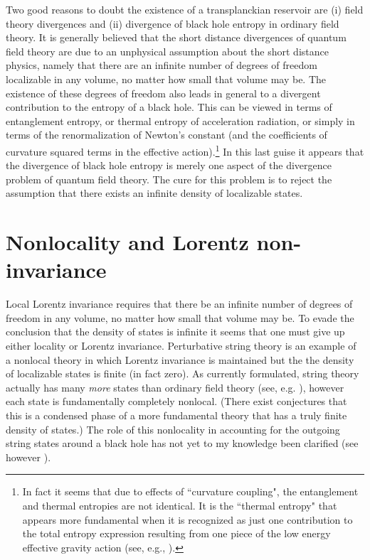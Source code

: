 \documentclass[12pt]{article}
\begin{document}
Two good reasons to doubt the existence of a transplanckian reservoir
are (i) field theory divergences and (ii) divergence of black hole
entropy in ordinary field theory.  It is generally believed that the
short distance divergences of quantum field theory are due to an
unphysical assumption about the short distance physics, namely that
there are  an infinite number of degrees of freedom localizable in any
volume, no matter how small that volume may be.  The existence of these
degrees of freedom also leads in general to a divergent contribution to
the entropy of a black hole. This can be viewed in terms of
entanglement entropy\cite{Sork,Bombetal,FrolNovi}, or thermal entropy
of acceleration radiation\cite{tHooft}, or simply in terms of the
renormalization of Newton's constant (and the coefficients of curvature
squared terms in the effective
action)\cite{SussUglu,Jacoindu}.\footnote{In fact it seems that due to
effects of ``curvature coupling", the entanglement and thermal
entropies are not identical. It is the ``thermal entropy" that appears
more fundamental when it is recognized as just one contribution to the
total entropy expression resulting from one piece of the low energy
effective gravity action (see, e.g., \cite{Frol-rev}).} In this last
guise it appears that the divergence of black hole entropy is merely
one aspect of the divergence problem of quantum field theory.  The cure
for this problem is to reject the assumption that there exists an
infinite density of localizable states.


\section{Nonlocality and Lorentz non-invariance}

Local Lorentz invariance requires that there be an infinite number of
degrees of freedom in any volume, no matter how small that volume may
be. To evade the conclusion that the density of states is infinite it
seems that one must give up either locality or Lorentz invariance.
Perturbative string theory is an example of a nonlocal theory in which
Lorentz invariance is maintained but the the density of localizable
states is finite (in fact zero)\cite{Suss-lor}.  As currently
formulated, string theory actually has many {\it more} states than
ordinary field theory (see, e.g. \cite{Pol-rev}), however each state is
fundamentally completely nonlocal. (There exist conjectures that this
is a condensed phase of a more fundamental theory that has a truly
finite density of states\cite{AticWitt}.) The role of this nonlocality
in accounting for the outgoing string states around a black hole has
not yet to my knowledge been clarified (see however
\cite{Suss-prl,Suss-lor,Engletal}).
\end{document}
